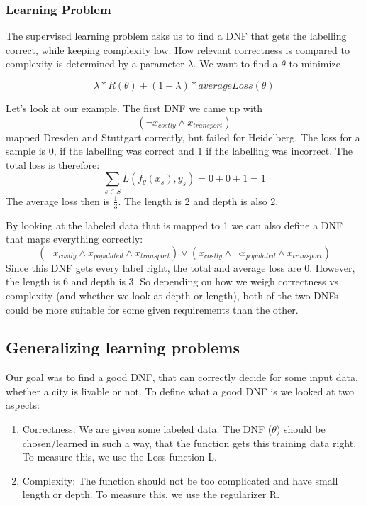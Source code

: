 \documentclass{article}
\begin{document}
\subsubsection{Learning Problem}
The supervised learning problem asks us to find a DNF that gets the labelling correct, while keeping complexity low. How relevant correctness is compared to complexity is determined by a parameter $\lambda$. We want to find a $\theta$ to minimize

\begin{equation*}
    \lambda * R(\theta) + (1-\lambda) * averageLoss(\theta)
\end{equation*}

Let's look at our example. The first DNF we came up with
\begin{equation*}
    (\lnot x_{costly} \land x_{transport})
\end{equation*}
mapped Dresden and Stuttgart correctly, but failed for Heidelberg. The loss for a sample is 0, if the labelling was correct and 1 if the labelling was incorrect. The total loss is therefore:
\begin{equation*}
\sum_{s \in S} L(f_\theta(x_s), y_s) = 0 + 0 + 1 = 1
\end{equation*}
The average loss then is $\frac{1}{3}$. The length is 2 and depth is also 2. 


By looking at the labeled data that is mapped to 1 we can also define a DNF that maps everything correctly:
\begin{equation*}
    (\lnot x_{costly} \land x_{populated} \land x_{transport}) \lor
    (x_{costly} \land \lnot x_{populated} \land x_{transport})
\end{equation*}
Since this DNF gets every label right, the total and average loss are 0. However, the length is 6 and depth is 3. So depending on how we weigh correctness vs complexity (and whether we look at depth or length), both of the two DNFs could be more suitable for some given requirements than the other.

\subsection{Generalizing learning problems}
Our goal was to find a good DNF, that can correctly decide for some input data, whether a city is livable or not.
To define what a good DNF is we looked at two aspects:

\begin{enumerate}
    \item Correctness: We are given some labeled data. The DNF ($\theta$) should be chosen/learned in such a way, that the function gets this training data right. To measure this, we use the Loss function L.
    \item Complexity: The function should not be too complicated and have small length or depth. To measure this, we use the regularizer R.
\end{enumerate}
\end{document}

